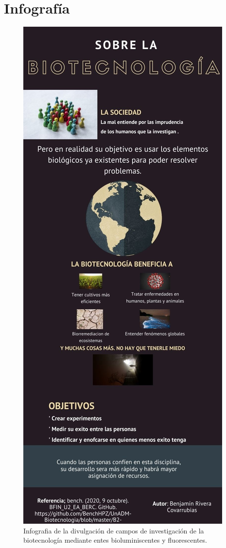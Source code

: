 \documentclass[12pt]{article}
\newcommand{\tema}[0]{divulgación de campos de investigación de la biotecnología mediante entes bioluminiscentes y fluorescentes}
\begin{document}
\appendix\newpage
\section{Infografía}
\begin{figure}[h]
	\centering
		\includegraphics[height=0.7\textheight]{infografia_biotecnologia.jpg}
	\caption{Infografia de la \tema.}
	\label{fig: }
\end{figure}
\end{document}
